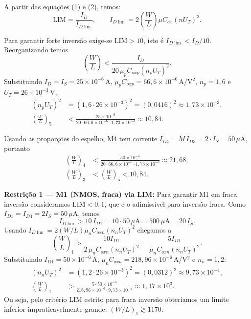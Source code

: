 ﻿\documentclass[12pt,a4paper]{article}
\begin{document}
A partir das equações (1) e (2), temos:
\begin{equation}
\mathrm{LIM} = \frac{I_D}{I_{D\lim}},\qquad I_{D\lim} = 2\left(\frac{W}{L}\right)\mu C_{ox}(nU_T)^2.
\end{equation}

Para garantir forte inversão exige-se $\mathrm{LIM}>10$, isto é $I_{D\lim}<I_D/10$. Reorganizando temos
\begin{equation}\label{eq:pmos-lim2}
\left(\frac{W}{L}\right) < \frac{I_D}{20\,\mu_p C_{ox p}(n_p U_T)^2}.
\end{equation}
Substituindo $I_D=I_S=25\times10^{-6}\,$A, $\mu_p C_{ox p}=66{,}6\times10^{-6}\,$A/V$^2$, $n_p=1{,}6$ e $U_T=26\times10^{-3}\,$V,
\begin{align*}
(n_p U_T)^2 &= (1{,}6\cdot 26\times10^{-3})^2 = (0{,}0416)^2\approx 1{,}73\times10^{-3},\\
\left(\frac{W}{L}\right)_5 &< \frac{25\times10^{-6}}{20\cdot 66{,}6\times10^{-6}\cdot 1{,}73\times10^{-3}} \approx \boxed{10{,}84}.
\end{align*}

Usando as proporções do espelho, M4 tem corrente $I_{D4}=M\,I_{D3}=2\cdot I_S = 50\,\mu$A, portanto
\begin{align*}
\left(\frac{W}{L}\right)_4 &< \frac{50\times10^{-6}}{20\cdot 66{,}6\times10^{-6}\cdot 1{,}73\times10^{-3}} \approx \boxed{21{,}68},\\
\left(\frac{W}{L}\right)_3 &< \left(\frac{W}{L}\right)_5 < 10{,}84.
\end{align*}

    	\textbf{Restrição 1 — M1 (NMOS, fraca) via LIM:}
Para garantir M1 em fraca inversão consideramos $\mathrm{LIM}<0{,}1$, que é o adimissível para inversão fraca. Como $I_{D1}=I_{D4}=2I_S=50\,\mu$A, temos
\begin{equation*}
I_{D\lim} > 10\,I_{D1} = 10\cdot 50\,\mu\text{A} = 500\,\mu\text{A} = 20\,I_S.
\end{equation*}
Usando $I_{D\lim}=2(W/L)\mu_n C_{ox n}(n_n U_T)^2$ chegamos a
\begin{equation*}
\left(\frac{W}{L}\right)_1 > \frac{10 I_{D1}}{2\,\mu_n C_{ox n}(n_n U_T)^2} = \frac{5 I_{D1}}{\mu_n C_{ox n}(n_n U_T)^2}.
\end{equation*}
Substituindo $I_{D1}=50\times10^{-6}\,$A, $\mu_n C_{ox n}=218{,}96\times10^{-6}\,$A/V$^2$ e $n_n=1{,}2$:
\begin{align*}
(n_n U_T)^2 &= (1{,}2\cdot26\times10^{-3})^2=(0{,}0312)^2\approx 9{,}73\times10^{-4},\\
\left(\frac{W}{L}\right)_1 &> \frac{5\cdot 50\times10^{-6}}{218{,}96\times10^{-6}\cdot 9{,}73\times10^{-4}} \approx \boxed{1{,}17\times10^{3}}.
\end{align*}
Ou seja, pelo critério LIM estrito para fraca inversão obteríamos um limite inferior impraticavelmente grande: $(W/L)_1\gtrsim 1170$.
\end{document}

